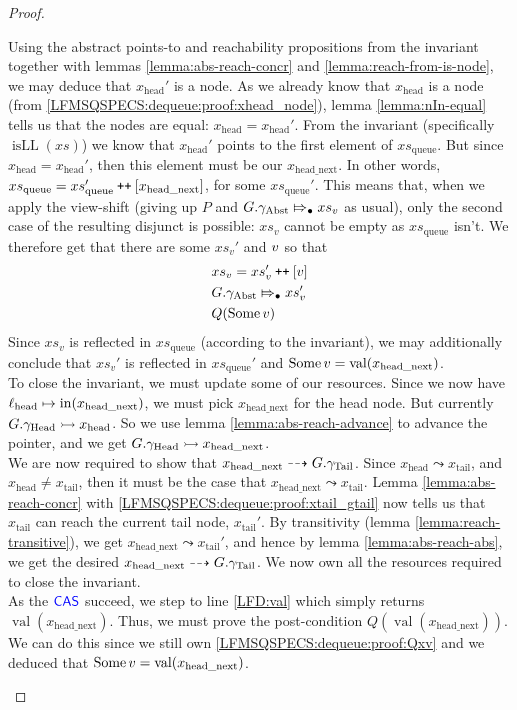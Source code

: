 \documentclass[a4paper, 10pt]{report}
\theoremstyle{definition}
\newcommand{\xsc}{xs}
\newcommand{\xsqueue}{xs_{\mathrm{queue}}}
\newcommand{\isLL}{\operatorname{isLL}}
\newcommand{\locN}[1]{\loc_{\mathrm{#1}}}
\newcommand{\lochead}{\locN{head}}
\newcommand{\nIn}[1]{\operatorname{in}(#1)}
\newcommand{\nVal}[1]{\operatorname{val}(#1)}
\newcommand{\node}{x}
\newcommand{\nodeN}[1]{\node_{\mathrm{#1}}}
\newcommand{\nodehead}{\nodeN{head}}
\newcommand{\nodetail}{\nodeN{tail}}
\newcommand{\nodeheadnext}{\nodeN{head\_next}}
\newcommand{\absvalue}{\val}
\newcommand{\absvalueList}{xs_v}
\newcommand{\Qg}{G}
\newcommand{\gabst}{\gname_{\mathrm{Abst}}}
\newcommand{\ghead}{\gname_{\mathrm{Head}}}
\newcommand{\gtail}{\gname_{\mathrm{Tail}}}
\newcommand\catenate{\mathbin{\text{\ttfamily\upshape ++}}}
\newcommand{\abstractstateauth}[2]{#1 \Mapsto_{\bullet} #2}
\newcommand{\reach}[2]{#1 \leadsto #2}
\newcommand{\ar}[2]{#1 \dashrightarrow #2}
\newcommand{\ap}[2]{#1 \rightarrowtail #2}
\begin{document}
\begin{proof}
\begin{itemize}
\begin{itemize}
      Using the abstract points-to and reachability propositions from the invariant together with lemmas \ref{lemma:abs-reach-concr} and \ref{lemma:reach-from-is-node}, we may deduce that $\nodehead'$ is a node. As we already know that $\nodehead$ is a node (from \ref{LFMSQSPECS:dequeue:proof:xhead_node}), lemma \ref{lemma:nIn-equal} tells us that the nodes are equal: $\nodehead = \nodehead'$. From the invariant (specifically $\isLL(\xsc)$) we know that $\nodehead'$ points to the first element of $\xsqueue$. But since $\nodehead = \nodehead'$, then this element must be our $\nodeheadnext$. In other words, $\xsqueue = \xsqueue' \catenate [\nodeheadnext]$, for some $\xsqueue'$.
      This means that, when we apply the view-shift (giving up $P$ and $\abstractstateauth{\Qg.\gabst}{\absvalueList}$ as usual), only the second case of the resulting disjunct is possible: $\absvalueList$ cannot be empty as $\xsqueue$ isn't. We therefore get that there are some $\absvalueList'$ and $\absvalue$ so that
      \begin{align}
        &\absvalueList = \absvalueList' \catenate [\absvalue]\\
        &\abstractstateauth{\Qg.\gabst}{\absvalueList'}\\
        &Q(\Some \absvalue)\label{LFMSQSPECS:dequeue:proof:Qxv}
      \end{align}
      Since $\absvalueList$ is reflected in $\xsqueue$ (according to the invariant), we may additionally conclude that $\absvalueList'$ is reflected in $\xsqueue'$ and $\Some \absvalue = \nVal{\nodeheadnext}$.\\
      To close the invariant, we must update some of our resources. Since we now have $\lochead \mapsto \nIn{\nodeheadnext}$, we must pick $\nodeheadnext$ for the head node. But currently $\ap{\Qg.\ghead}{\nodehead}$. So we use lemma \ref{lemma:abs-reach-advance} to advance the pointer, and we get $\ap{\Qg.\ghead}{\nodeheadnext}$.\\
      We are now required to show that $\ar{\nodeheadnext}{\Qg.\gtail}$. Since $\reach{\nodehead}{\nodetail}$, and $\nodehead \neq \nodetail$, then it must be the case that $\reach{\nodeheadnext}{\nodetail}$. Lemma \ref{lemma:abs-reach-concr} with \ref{LFMSQSPECS:dequeue:proof:xtail_gtail} now tells us that $\nodetail$ can reach the current tail node, $\nodetail'$. By transitivity (lemma \ref{lemma:reach-transitive}), we get $\reach{\nodeheadnext}{\nodetail'}$, and hence by lemma \ref{lemma:abs-reach-abs}, we get the desired $\ar{\nodeheadnext}{\Qg.\gtail}$. We now own all the resources required to close the invariant.\\
      As the $\textsf{\color{blue} CAS}$ succeed, we step to line \ref{LFD:val} which simply returns $\nVal{\nodeheadnext}$. Thus, we must prove the post-condition $Q(\nVal{\nodeheadnext})$. We can do this since we still own \ref{LFMSQSPECS:dequeue:proof:Qxv} and we deduced that $\Some \absvalue = \nVal{\nodeheadnext}$.
    \end{itemize}


\end{itemize}
\end{proof}
\end{document}
